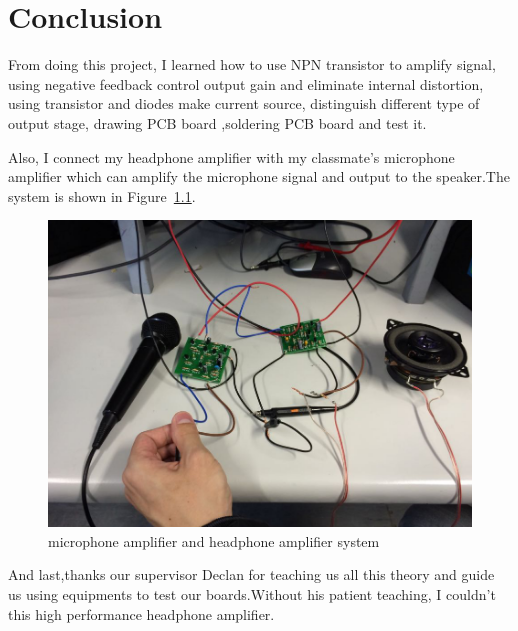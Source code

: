 \chapter{Conclusion}
From doing this project, I learned how to use NPN transistor to amplify signal, using negative feedback control output gain and eliminate internal distortion, using transistor and diodes make current source, distinguish different type of output stage, drawing PCB board ,soldering PCB board and test it.

Also, I connect my headphone amplifier with my classmate's microphone amplifier which can amplify the microphone signal and output to the speaker.The system is shown in Figure~\ref{fig:micophone amplifier and headphone amplifier system}.
\begin{figure}[htbp]
\centering
\includegraphics[scale=0.6]{"../Photo/Chap7/last system"}
\caption{microphone amplifier and headphone amplifier system}
\label{fig:micophone amplifier and headphone amplifier system}
\end{figure}

And last,thanks our supervisor Declan for teaching us all this theory and guide us using equipments to test our boards.Without his patient teaching, I couldn't this high performance headphone amplifier.